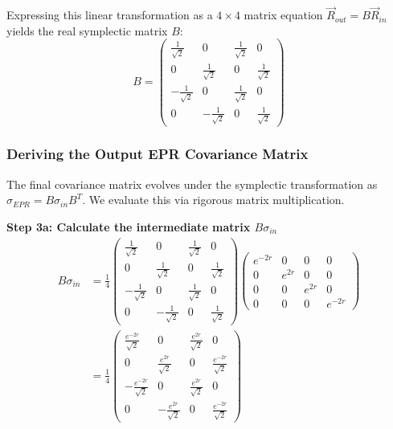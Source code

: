 Expressing this linear transformation as a $4 \times 4$ matrix equation $\vec{R}_{out} = B\vec{R}_{in}$ yields the real symplectic matrix $B$:
\begin{equation*}
B = \begin{pmatrix} \frac{1}{\sqrt{2}} & 0 & \frac{1}{\sqrt{2}} & 0 \\ 0 & \frac{1}{\sqrt{2}} & 0 & \frac{1}{\sqrt{2}} \\ -\frac{1}{\sqrt{2}} & 0 & \frac{1}{\sqrt{2}} & 0 \\ 0 & -\frac{1}{\sqrt{2}} & 0 & \frac{1}{\sqrt{2}} \end{pmatrix}
\end{equation*}

\subsubsection{Deriving the Output EPR Covariance Matrix }
The final covariance matrix evolves under the symplectic transformation as $\sigma_{EPR} = B \sigma_{in} B^T$. We evaluate this via rigorous matrix multiplication. 

\textbf{Step 3a: Calculate the intermediate matrix $B \sigma_{in}$}
\begin{align*}
B \sigma_{in} &= \frac{1}{4} \begin{pmatrix} \frac{1}{\sqrt{2}} & 0 & \frac{1}{\sqrt{2}} & 0 \\ 0 & \frac{1}{\sqrt{2}} & 0 & \frac{1}{\sqrt{2}} \\ -\frac{1}{\sqrt{2}} & 0 & \frac{1}{\sqrt{2}} & 0 \\ 0 & -\frac{1}{\sqrt{2}} & 0 & \frac{1}{\sqrt{2}} \end{pmatrix} \begin{pmatrix} e^{-2r} & 0 & 0 & 0 \\ 0 & e^{2r} & 0 & 0 \\ 0 & 0 & e^{2r} & 0 \\ 0 & 0 & 0 & e^{-2r} \end{pmatrix} \\
&= \frac{1}{4} \begin{pmatrix} \frac{e^{-2r}}{\sqrt{2}} & 0 & \frac{e^{2r}}{\sqrt{2}} & 0 \\ 0 & \frac{e^{2r}}{\sqrt{2}} & 0 & \frac{e^{-2r}}{\sqrt{2}} \\ -\frac{e^{-2r}}{\sqrt{2}} & 0 & \frac{e^{2r}}{\sqrt{2}} & 0 \\ 0 & -\frac{e^{2r}}{\sqrt{2}} & 0 & \frac{e^{-2r}}{\sqrt{2}} \end{pmatrix}
\end{align*}

